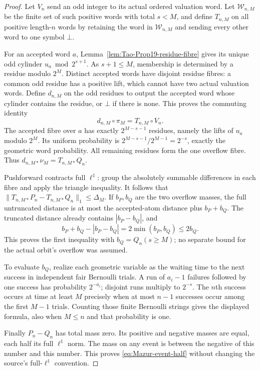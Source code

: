 \begin{proof}
Let $V_n$ send an odd integer to its actual ordered valuation word.
Let $\mathcal W_{n,M}$ be the finite set of such positive words with
total $s<M$, and define $T_{n,M}$ on all positive length-$n$ words
by retaining the word in $\mathcal W_{n,M}$ and sending every other
word to one symbol $\bot$.

For an accepted word $a$, Lemma~\ref{lem:Tao-Prop19-residue-fibre} gives its
unique odd cylinder $u_a\bmod2^{s+1}$.
As $s+1\le M$, membership is determined by a residue modulo $2^M$.
Distinct accepted words have disjoint residue fibres: a common odd
residue has a positive lift, which cannot have two actual valuation
words. Define $d_{n,M}$ on the odd residues to output the accepted
word whose cylinder contains the residue, or $\bot$ if there is none.
This proves the commuting identity
\[
 d_{n,M}\circ\pi_M=T_{n,M}\circ V_n.
\]
The accepted fibre over $a$ has exactly $2^{M-s-1}$ residues,
namely the lifts of $u_a$ modulo $2^M$. Its uniform probability is
$2^{M-s-1}/2^{M-1}=2^{-s}$, exactly the geometric word probability.
All remaining residues form the one overflow fibre. Thus
$d_{n,M*}\nu_M=T_{n,M*}Q_n$.

Pushforward contracts full $\ell^1$: group the absolutely summable
differences in each fibre and apply the triangle inequality.
It follows that $\|T_{n,M*}P_n-T_{n,M*}Q_n\|_1\le\Delta_M$.
If $b_P,b_Q$ are the two overflow masses, the full untruncated
distance is at most the accepted-atom distance plus $b_P+b_Q$.
The truncated distance already contains $|b_P-b_Q|$, and
\[
 b_P+b_Q-|b_P-b_Q|=2\min(b_P,b_Q)\le2b_Q.
\]
This proves the first inequality with $b_Q=Q_n(s\ge M)$;
no separate bound for the actual orbit's overflow was assumed.

To evaluate $b_Q$, realize each geometric variable as the waiting
time to the next success in independent fair Bernoulli trials.
A run of $a_i-1$ failures followed by one success has probability
$2^{-a_i}$; disjoint runs multiply to $2^{-s}$.
The $n$th success occurs at time at least $M$ precisely when at most
$n-1$ successes occur among the first $M-1$ trials. Counting those
finite Bernoulli strings gives the displayed formula, also when
$M\le n$ and that probability is one.

Finally $P_n-Q_n$ has total mass zero. Its positive and negative
masses are equal, each half its full $\ell^1$ norm. The mass on
any event is between the negative of this number and this number.
This proves \eqref{eq:Mazur-event-half} without changing the
source's full-$\ell^1$ convention.
\end{proof}

